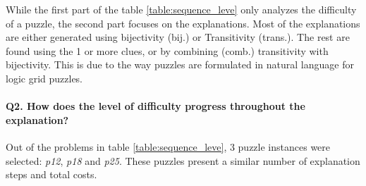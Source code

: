 \begin{table}
	\centering
\caption{Puzzle explanation cost based on the cost function $f(I, C)$ and statistics on puzzle constraints}
\label{table:sequence_leve}
\end{table}

While the first part of the table \ref{table:sequence_leve} only analyzes the difficulty of a puzzle, the second part focuses on the explanations. 
Most of the explanations are either generated using bijectivity (bij.) or Transitivity (trans.). The rest are found using the 1 or more clues, or by combining (comb.) transitivity with bijectivity. This is due to the way puzzles are formulated in natural language for logic grid puzzles.

\paragraph{Q2. How does the level of difficulty progress throughout the explanation?} Out of the problems in table \ref{table:sequence_leve}, 3 puzzle instances were selected: \textit{p12}, \textit{p18} and \textit{p25}. These puzzles present a similar number of explanation steps and total costs.


